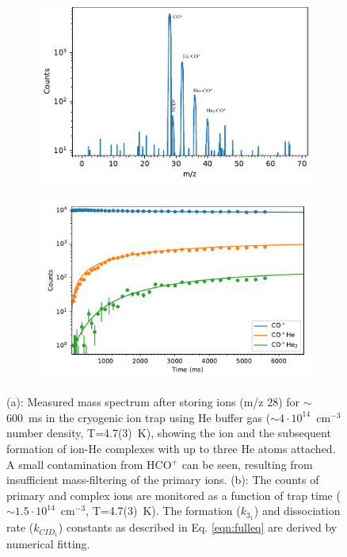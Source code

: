 \begin{figure}[!htb]
     \centering
     \begin{subfigure}[b]{0.49\textwidth}
         \centering
         \includegraphics[width=1\textwidth]{chapters/CO+_ROSAA_paper/CO+_masspec.pdf}
         \caption{}
         \label{fig:CO+:masspec}
     \end{subfigure}
     \hfill
     \begin{subfigure}[b]{0.49\textwidth}
         \centering
         \includegraphics[width=1\textwidth]{chapters/CO+_ROSAA_paper/CO+_kinetics.pdf}
         \caption{}
         \label{fig:kinetics}
     \end{subfigure}
     
        \caption{(a): Measured mass spectrum after storing \co ions (m/z 28) for $\sim$600~ms in the cryogenic ion trap using He buffer gas ($\sim 4\cdot10^{14}$~cm$^{-3}$ number density, T=4.7(3)~K), showing the \co ion and the subsequent formation of ion-He complexes with up to three He atoms attached. A small contamination from HCO$^+$ can be seen, resulting from insufficient mass-filtering of the primary ions. (b): The counts of primary and complex ions are monitored as a function of trap time ($\sim 1.5\cdot10^{14}$~cm$^{-3}$, T=4.7(3)~K). The formation ($k_{3_1}$) and dissociation rate ($k_{CID_1}$) constants as described in Eq. \ref{eqn:fulleq} are derived by numerical fitting.}
        \label{fig:masspec-kinetics}
\end{figure}

